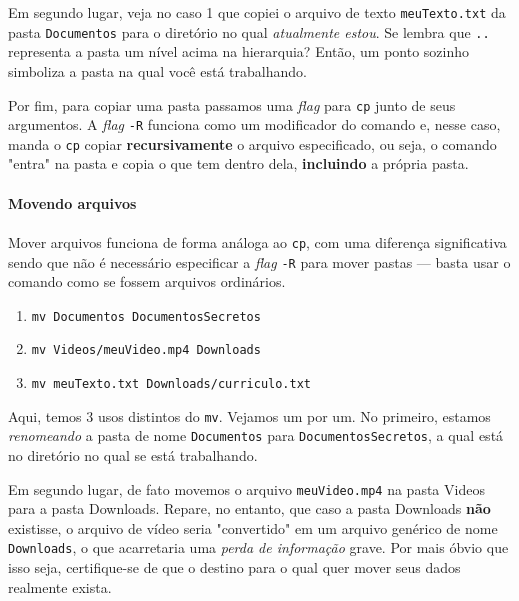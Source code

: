 \documentclass{article}
\begin{document}
	Em segundo lugar, veja no caso 1 que copiei o arquivo de texto \texttt{meuTexto.txt} da pasta \texttt{Documentos} 
	para o diretório no qual \textit{atualmente estou}. Se lembra que \texttt{..} representa a pasta um nível acima
	na hierarquia? Então, um ponto sozinho simboliza a pasta na qual você está trabalhando. 
	
	Por fim, para copiar uma pasta passamos uma \textit{flag} para \texttt{cp} junto de seus argumentos. 
	A \textit{flag} \texttt{-R} funciona como um modificador do comando e, nesse caso, manda o \texttt{cp}
	copiar \textbf{recursivamente} o arquivo especificado, ou seja, o comando "entra" na pasta e copia o que
	tem dentro dela, \textbf{incluindo} a própria pasta. 

	
	\paragraph{Movendo arquivos}
	\paragraph{}

	Mover arquivos funciona de forma análoga ao \texttt{cp}, com uma diferença significativa sendo que não é necessário 
	especificar a \textit{flag} \texttt{-R} para mover pastas --- basta usar o comando como se fossem arquivos ordinários. 

	\begin{enumerate} 
		\item{\texttt{mv Documentos DocumentosSecretos}} 
		\item{\texttt{mv Videos/meuVideo.mp4 Downloads}} 
		\item{\texttt{mv meuTexto.txt Downloads/curriculo.txt}} 
	\end{enumerate} 

	Aqui, temos 3 usos distintos do \texttt{mv}. Vejamos um por um. No primeiro, estamos \textit{renomeando} a pasta de 
	nome \texttt{Documentos} para \texttt{DocumentosSecretos}, a qual está no diretório no qual se está trabalhando. 


	Em segundo lugar, de fato movemos o arquivo \texttt{meuVideo.mp4} na pasta Videos para a pasta Downloads. Repare, no 
	entanto, que caso a pasta Downloads \textbf{não} existisse, o arquivo de vídeo seria "convertido" em um arquivo 
	genérico de nome \texttt{Downloads}, o que acarretaria uma \textit{perda de informação} grave. Por mais óbvio que isso
	seja, certifique-se de que o destino para o qual quer mover seus dados realmente exista. 
\end{document}
